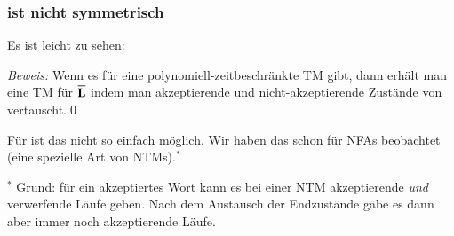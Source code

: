 \documentclass[onlymath]{beamer}
\begin{document}
\begin{frame}\frametitle{ ist nicht symmetrisch}

Es ist leicht zu sehen:


\emph{Beweis:} Wenn es für  eine polynomiell-zeitbeschränkte TM 
gibt, dann erhält man eine TM für $\overline{\textbf{\textcolor{black}{L}}}$ indem man akzeptierende
und nicht-akzeptierende Zustände von  vertauscht.\qed
\medskip\pause

Für  ist das nicht so einfach möglich. Wir haben das schon für NFAs beobachtet (eine spezielle Art von NTMs).${}^*$

\pause


\medskip

{\tiny ${}^*$ Grund: für ein akzeptiertes Wort kann es bei einer NTM akzeptierende \emph{und} verwerfende Läufe geben. Nach dem Austausch der Endzustände gäbe es dann aber immer noch akzeptierende Läufe.\\
}

\end{frame}


\newcommand{\ppred}[1]{\color{myred}{\text{r}_{#1}}\color{text}{}}
\newcommand{\pgreen}[1]{\color{mygreen}{\text{g}_{#1}}\color{text}{}}
\newcommand{\pblue}[1]{\color{myblue}{\text{b}_{#1}}\color{text}{}}
\end{document}
